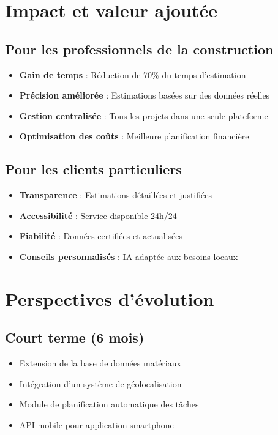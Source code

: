 \documentclass[12pt, a4paper]{report}
\begin{document}
\section{Impact et valeur ajoutée}

\subsection{Pour les professionnels de la construction}

\begin{itemize}
    \item \textbf{Gain de temps} : Réduction de 70\% du temps d'estimation
    \item \textbf{Précision améliorée} : Estimations basées sur des données réelles
    \item \textbf{Gestion centralisée} : Tous les projets dans une seule plateforme
    \item \textbf{Optimisation des coûts} : Meilleure planification financière
\end{itemize}

\subsection{Pour les clients particuliers}

\begin{itemize}
    \item \textbf{Transparence} : Estimations détaillées et justifiées
    \item \textbf{Accessibilité} : Service disponible 24h/24
    \item \textbf{Fiabilité} : Données certifiées et actualisées
    \item \textbf{Conseils personnalisés} : IA adaptée aux besoins locaux
\end{itemize}

\section{Perspectives d'évolution}

\subsection{Court terme (6 mois)}

\begin{itemize}
    \item Extension de la base de données matériaux
    \item Intégration d'un système de géolocalisation
    \item Module de planification automatique des tâches
    \item API mobile pour application smartphone
\end{itemize}
\end{document}
